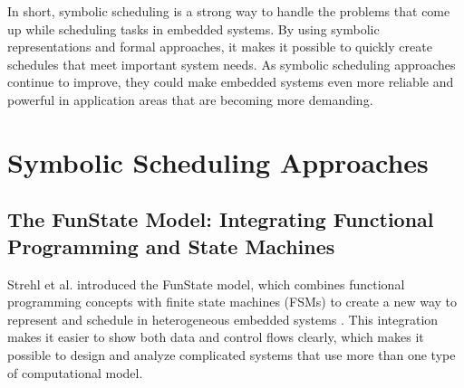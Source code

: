 \documentclass[conference]{IEEEtran}
\begin{document}
In short, symbolic scheduling is a strong way to handle the problems that come up while scheduling tasks in embedded systems.  By using symbolic representations and formal approaches, it makes it possible to quickly create schedules that meet important system needs.  As symbolic scheduling approaches continue to improve, they could make embedded systems even more reliable and powerful in application areas that are becoming more demanding.


\section{\textbf{Symbolic Scheduling Approaches}}


\subsection{The FunState Model: Integrating Functional Programming and State Machines}

Strehl et al. introduced the FunState model, which combines functional programming concepts with finite state machines (FSMs) to create a new way to represent and schedule in heterogeneous embedded systems \cite{strehl1999scheduling}.  This integration makes it easier to show both data and control flows clearly, which makes it possible to design and analyze complicated systems that use more than one type of computational model.
\end{document}
